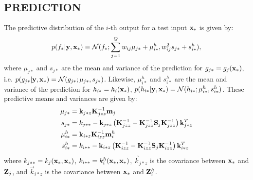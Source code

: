 \subsection{PREDICTION}
The predictive distribution of the $i$-th output for a test input $\mathbf{x}_*$ is given by:
\begin{align}
p(f_* | \mathbf{y}, \mathbf{x}_*) = \mathcal{N}(f_*; \sum_{j=1}^Q w_{ij} \mu_{j*} + \mu^h_{i*}, w_{ij}^2 s_{j*} + s^h_{i*}), 
\end{align}
where $\mu_{j*}$ and $s_{j*}$ are the mean and variance of the prediction for $g_{j*} = g_j(\mathbf{x}_*)$, i.e. $p(g_{j*} | \mathbf{y}, \mathbf{x}_*) = \mathcal{N}(g_{j*}; \mu_{j*}, s_{j*})$.
Likewise, $\mu^h_{i*}$ and $s^h_{i*}$ are the mean and variance of the prediction for $h_{i*} = h_i(\mathbf{x}_*)$, $p(h_{i*} | \mathbf{y}, \mathbf{x}_*) = \mathcal{N}(h_{i*}; \mu^h_{i*}, s^h_{i*})$.
These predictive means and variances are given by: 
\begin{align}
\mu_{j*} &= \mathbf{k}_{j*z} \mathbf{K}_{jzz}^{-1} \mathbf{m}_j \\ s_{j*} &= k_{j**} - \mathbf{k}_{j*z} \left(\mathbf{K}_{jzz}^{-1} - \mathbf{K}_{jzz}^{-1} \mathbf{S}_j \mathbf{K}_{jzz}^{-1} \right) \mathbf{k}_{j*z}^T \\
\mu^h_{i*} &= \mathbf{k}_{i*z} \mathbf{K}_{izz}^{-1} \mathbf{m}^h_i \\
s^h_{i*} &= k_{i**} - \mathbf{k}_{i*z} \left(\mathbf{K}_{izz}^{-1} - \mathbf{K}_{izz}^{-1} \mathbf{S}_j \mathbf{K}_{izz}^{-1} \right) \mathbf{k}_{i*z}^T
\end{align}
where $k_{j**} = k_j(\mathbf{x}_*, \mathbf{x}_*)$, $k_{i**} = k^h_i(\mathbf{x}_*, \mathbf{x}_*)$,  $\vec{k}_{j*z}$ is the covariance between $\mathbf{x}_*$ and $\mathbf{Z}_j$, and $\vec{k}_{i*z}$ is the covariance between $\mathbf{x}_*$ and $\mathbf{Z}^h_i$.

 
